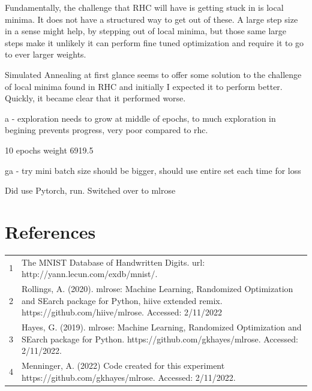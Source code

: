 \documentclass[letterpaper]{article} %
\begin{document}
Fundamentally, the challenge that RHC will have is getting stuck in is local minima.  It does not have a structured way to get out of these.  A large step size in a sense might help, by stepping out of local minima, but those same large steps make it unlikely it can perform fine tuned optimization and require it to go to ever larger weights.   

Simulated Annealing at first glance seems to offer some solution to the challenge of local minima found in RHC and initially I expected it to perform better.  Quickly, it became clear that it performed worse.

a - exploration needs to grow at middle of epochs, to much exploration in begining prevents progress, very poor compared to rhc.

10 epochs weight 6919.5

ga - try mini batch size should be bigger, should use entire set each time for loss

Did use Pytorch, run.  Switched over to mlrose


\section{References}
\begin{tabular}{l p{2.75in}}
\\
1 & The MNIST Database of Handwritten Digits. url: http://yann.lecun.com/exdb/mnist/.
\\
2 & Rollings, A. (2020). mlrose: Machine Learning, Randomized Optimization and SEarch package for Python, hiive extended remix. https://github.com/hiive/mlrose. Accessed: 2/11/2022
\\
3 & Hayes, G. (2019). mlrose: Machine Learning, Randomized Optimization and SEarch package for Python. https://github.com/gkhayes/mlrose. Accessed: 2/11/2022.
\\
4 & Menninger, A. (2022)  Code created for this experiment https://github.com/gkhayes/mlrose. Accessed: 2/11/2022.
\end{tabular}
\end{document}
